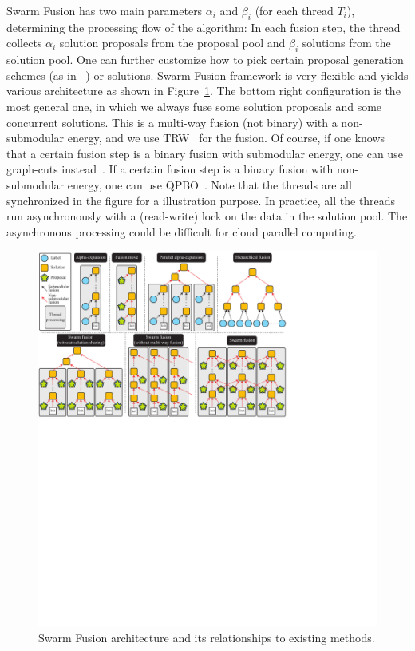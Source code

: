Swarm Fusion has two main parameters $\alpha_i$ and $\beta_i$ (for each thread
$T_i$), determining the processing flow of the algorithm: In each fusion
step, the thread collects $\alpha_i$ solution proposals from the
proposal pool and $\beta_i$ solutions from the solution pool.
%
One can further customize how to pick certain proposal generation
schemes (as in ~\cite{delong}) or solutions. Swarm Fusion framework is
very flexible and yields various architecture as shown in
Figure~\ref{fig:model}.
%
The bottom right configuration is the most general one, in which we
always fuse some solution proposals and some concurrent solutions. This
is a multi-way fusion (not binary) with a non-submodular energy, and we
use TRW~\cite{kolmogorov} for the fusion. Of course, if one knows that a
certain fusion step is a binary fusion with submodular energy, one can
use graph-cuts instead~\cite{alpha_expansion_paper}. If a certain fusion
step is a binary fusion with non-submodular energy, one can use
QPBO~\cite{second_order_smoothness_stereo}.
%
Note that the threads are all synchronized in the figure for a
illustration purpose. In practice, all the threads run asynchronously
with a (read-write) lock on the data in the solution pool. The
asynchronous processing could be difficult for cloud parallel computing.
%
\begin{figure}[tb]
 \includegraphics[width=\columnwidth]{figure/model.pdf} \caption{Swarm
 Fusion architecture and its relationships to existing methods.
}\label{fig:model}
\end{figure}
%
%


